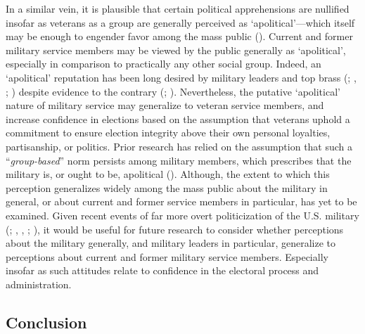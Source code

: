 \documentclass[
  12pt,
  letterpaper,
]{article}
\begin{document}
In a similar vein, it is plausible that certain political apprehensions
are nullified insofar as veterans as a group are generally perceived as
`apolitical'---which itself may be enough to engender favor among the
mass public ().
Current and former military service members may be viewed by the public
generally as `apolitical', especially in comparison to practically any
other social group. Indeed, an `apolitical' reputation has been long
desired by military leaders and top brass (; ,
; ) despite evidence to the contrary
(;
). Nevertheless, the putative
`apolitical' nature of military service may generalize to veteran
service members, and increase confidence in elections based on the
assumption that veterans uphold a commitment to ensure election
integrity above their own personal loyalties, partisanship, or politics.
Prior research has relied on the assumption that such a
``\emph{group-based}'' norm persists among military members, which
prescribes that the military is, or ought to be, apolitical
(). Although, the
extent to which this perception generalizes widely among the mass public
about the military in general, or about current and former service
members in particular, has yet to be examined. Given recent events of
far more overt politicization of the U.S. military
(;
,
, ;
), it would be useful for future
research to consider whether perceptions about the military generally,
and military leaders in particular, generalize to perceptions about
current and former military service members. Especially insofar as such
attitudes relate to confidence in the electoral process and
administration.

\subsection{Conclusion}\label{conclusion}
\end{document}
